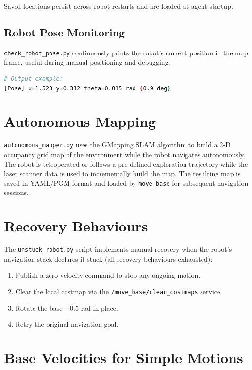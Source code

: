 Saved locations persist across robot restarts and are loaded at agent startup.

\subsection{Robot Pose Monitoring}

\texttt{check\_robot\_pose.py} continuously prints the robot's current position in
the map frame, useful during manual positioning and debugging:

\begin{lstlisting}[language=bash]
# Output example:
[Pose] x=1.523 y=0.312 theta=0.015 rad (0.9 deg)
\end{lstlisting}

\section{Autonomous Mapping}

\texttt{autonomous\_mapper.py} uses the GMapping SLAM algorithm to build a 2-D
occupancy grid map of the environment while the robot navigates autonomously.
The robot is teleoperated or follows a pre-defined exploration trajectory while
the laser scanner data is used to incrementally build the map.
The resulting map is saved in YAML/PGM format and loaded by \texttt{move\_base} for
subsequent navigation sessions.

\section{Recovery Behaviours}

The \texttt{unstuck\_robot.py} script implements manual recovery when the robot's
navigation stack declares it stuck (all recovery behaviours exhausted):

\begin{enumerate}[noitemsep]
  \item Publish a zero-velocity command to stop any ongoing motion.
  \item Clear the local costmap via the \texttt{/move\_base/clear\_costmaps} service.
  \item Rotate the base $\pm$0.5 rad in place.
  \item Retry the original navigation goal.
\end{enumerate}

\section{Base Velocities for Simple Motions}

